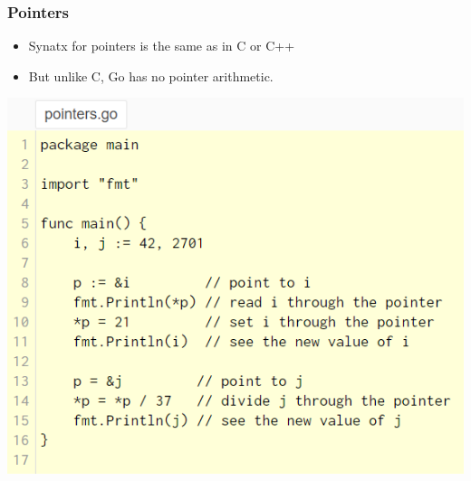 \documentclass[14pt]{beamer}
\begin{document}
{
\begin{frame}
    \frametitle{Pointers}
    \begin{itemize}
        \item Synatx for pointers is the same as in C or C++
        \item But unlike C, Go has no pointer arithmetic.
    \end{itemize}
    \begin{center}
        \includegraphics[width=0.6\linewidth]{img/pointers.PNG}
    \end{center}
\end{frame}
}
\end{document}
